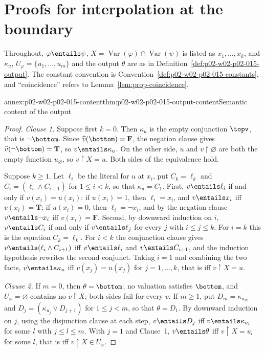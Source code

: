\section{Proofs for interpolation at the boundary}
\label{sec:annex-p02-w02-p02-015-interpolation-boundary}

Throughout, \(\varphi\entails\psi\),
\(X=\operatorname{Var}(\varphi)\cap\operatorname{Var}(\psi)\) is listed as
\(x_1,\ldots,x_k\), and \(\kappa_u\), \(U_\varphi=\{u_1,\ldots,u_m\}\) and
the output \(\theta\) are as in
Definition~\ref{def:p02-w02-p02-015-output}.  The constant convention is
Convention~\ref{def:p02-w02-p02-015-constants}, and ``coincidence'' refers to
Lemma~\ref{lem:prop-coincidence}.

\begin{annexitem}{annex:p02-w02-p02-015-content}{thm:p02-w02-p02-015-output-content}{Semantic content of the output}
\begin{proof}
\emph{Clause 1.}  Suppose first \(k=0\).  Then \(\kappa_u\) is the empty
conjunction \(\topv\), that is \(\neg\bottom\).  Since
\(\widehat v(\bottom)=\mathbf{F}\), the negation clause gives
\(\widehat v(\neg\bottom)=\mathbf{T}\), so \(v\entails\kappa_u\).  On the other
side, \(u\) and \(v\mathbin{\upharpoonright}\varnothing\) are both the empty
function \(u_\varnothing\), so \(v\mathbin{\upharpoonright}X=u\).  Both sides
of the equivalence hold.

Suppose \(k\geq 1\).  Let \(\ell_i\) be the literal for \(u\) at \(x_i\), put
\(C_k=\ell_k\) and \(C_i=(\ell_i\land C_{i+1})\) for \(1\leq i<k\), so that
\(\kappa_u=C_1\).  First, \(v\entails\ell_i\) if and only if
\(v(x_i)=u(x_i)\): if \(u(x_i)=1\), then \(\ell_i=x_i\), and
\(v\entails x_i\) iff \(v(x_i)=\mathbf{T}\); if \(u(x_i)=0\), then
\(\ell_i=\neg x_i\), and by the negation clause \(v\entails\neg x_i\) iff
\(v(x_i)=\mathbf{F}\).  Second, by downward induction on \(i\),
\(v\entails C_i\) if and only if \(v\entails\ell_j\) for every \(j\) with
\(i\leq j\leq k\).  For \(i=k\) this is the equation \(C_k=\ell_k\).  For
\(i<k\) the conjunction clause gives \(v\entails(\ell_i\land C_{i+1})\) iff
\(v\entails\ell_i\) and \(v\entails C_{i+1}\), and the induction hypothesis
rewrites the second conjunct.  Taking \(i=1\) and combining the two facts,
\(v\entails\kappa_u\) iff \(v(x_j)=u(x_j)\) for \(j=1,\ldots,k\), that is iff
\(v\mathbin{\upharpoonright}X=u\).

\emph{Clause 2.}  If \(m=0\), then \(\theta=\bottom\); no valuation satisfies
\(\bottom\), and \(U_\varphi=\varnothing\) contains no
\(v\mathbin{\upharpoonright}X\); both sides fail for every \(v\).  If
\(m\geq 1\), put \(D_m=\kappa_{u_m}\) and
\(D_j=(\kappa_{u_j}\lor D_{j+1})\) for \(1\leq j<m\), so that
\(\theta=D_1\).  By downward induction on \(j\), using the disjunction clause
at each step, \(v\entails D_j\) iff \(v\entails\kappa_{u_l}\) for some \(l\)
with \(j\leq l\leq m\).  With \(j=1\) and Clause~1, \(v\entails\theta\) iff
\(v\mathbin{\upharpoonright}X=u_l\) for some \(l\), that is iff
\(v\mathbin{\upharpoonright}X\in U_\varphi\).


\end{proof}
\end{annexitem}
